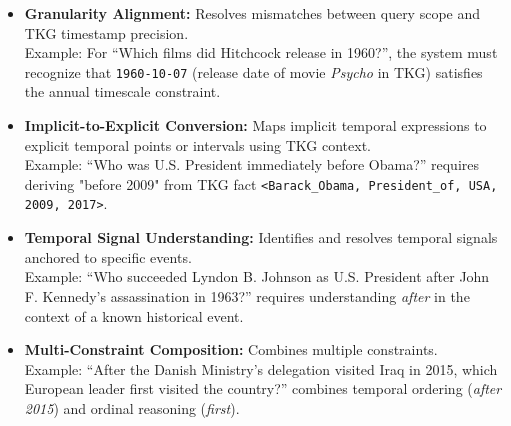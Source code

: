 \begin{itemize}
    \item \textbf{Granularity Alignment:} Resolves mismatches between query scope and TKG timestamp precision.\\
    Example: For ``Which films did Hitchcock release in 1960?'', the system must recognize that \texttt{1960-10-07}  (release date of movie \textit{Psycho} in TKG) satisfies the annual timescale constraint.
    
    \item \textbf{Implicit-to-Explicit Conversion:} Maps implicit temporal expressions to explicit temporal points or intervals using TKG context.\\
    Example: ``Who was U.S. President immediately before Obama?'' requires deriving "before 2009" from TKG fact \texttt{<Barack\_Obama, President\_of, USA, 2009, 2017>}.

    \item \textbf{Temporal Signal Understanding:} Identifies and resolves temporal signals anchored to specific events.\\
    Example: ``Who succeeded Lyndon B. Johnson as U.S. President after John F. Kennedy's assassination in 1963?'' requires understanding \textit{after} in the context of a known historical event.
    
    \item \textbf{Multi-Constraint Composition:} Combines multiple constraints.\\
    Example: ``After the Danish Ministry's delegation visited Iraq in 2015, which European leader first visited the country?'' combines temporal ordering (\textit{after 2015}) and ordinal reasoning (\textit{first}).
\end{itemize}